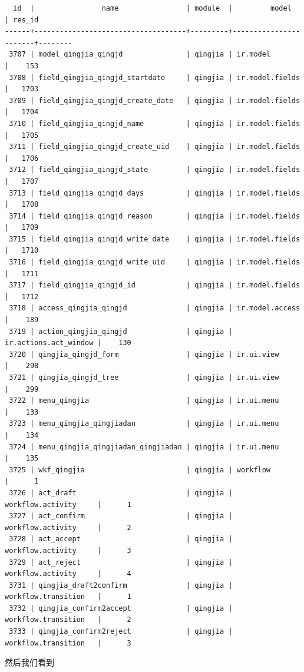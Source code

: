 \documentclass[11pt,a4paper]{sphinxmanual}
\begin{document}
\begin{Verbatim}
  id  |                name                | module  |         model         | res_id 
------+------------------------------------+---------+-----------------------+--------
 3707 | model_qingjia_qingjd               | qingjia | ir.model              |    153
 3708 | field_qingjia_qingjd_startdate     | qingjia | ir.model.fields       |   1703
 3709 | field_qingjia_qingjd_create_date   | qingjia | ir.model.fields       |   1704
 3710 | field_qingjia_qingjd_name          | qingjia | ir.model.fields       |   1705
 3711 | field_qingjia_qingjd_create_uid    | qingjia | ir.model.fields       |   1706
 3712 | field_qingjia_qingjd_state         | qingjia | ir.model.fields       |   1707
 3713 | field_qingjia_qingjd_days          | qingjia | ir.model.fields       |   1708
 3714 | field_qingjia_qingjd_reason        | qingjia | ir.model.fields       |   1709
 3715 | field_qingjia_qingjd_write_date    | qingjia | ir.model.fields       |   1710
 3716 | field_qingjia_qingjd_write_uid     | qingjia | ir.model.fields       |   1711
 3717 | field_qingjia_qingjd_id            | qingjia | ir.model.fields       |   1712
 3718 | access_qingjia_qingjd              | qingjia | ir.model.access       |    189
 3719 | action_qingjia_qingjd              | qingjia | ir.actions.act_window |    130
 3720 | qingjia_qingjd_form                | qingjia | ir.ui.view            |    298
 3721 | qingjia_qingjd_tree                | qingjia | ir.ui.view            |    299
 3722 | menu_qingjia                       | qingjia | ir.ui.menu            |    133
 3723 | menu_qingjia_qingjiadan            | qingjia | ir.ui.menu            |    134
 3724 | menu_qingjia_qingjiadan_qingjiadan | qingjia | ir.ui.menu            |    135
 3725 | wkf_qingjia                        | qingjia | workflow              |      1
 3726 | act_draft                          | qingjia | workflow.activity     |      1
 3727 | act_confirm                        | qingjia | workflow.activity     |      2
 3728 | act_accept                         | qingjia | workflow.activity     |      3
 3729 | act_reject                         | qingjia | workflow.activity     |      4
 3731 | qingjia_draft2confirm              | qingjia | workflow.transition   |      1
 3732 | qingjia_confirm2accept             | qingjia | workflow.transition   |      2
 3733 | qingjia_confirm2reject             | qingjia | workflow.transition   |      3
\end{Verbatim}

然后我们看到
\end{document}
